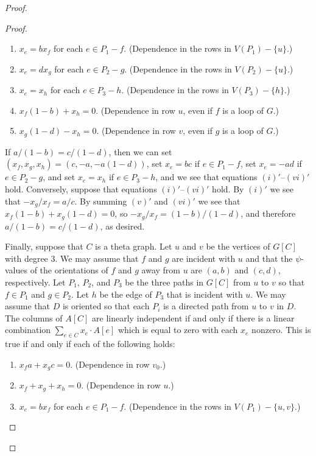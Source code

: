 \documentclass[12pt]{article}
\theoremstyle{definition}
\begin{document}
\begin{proof}
\begin{proof}
\begin{enumerate}[label=$(\roman*)'$]
    \item $x_e = bx_f$ for each $e \in P_1 - f$. (Dependence in the rows in $V(P_1) - \{u\}$.)

    \item $x_e = dx_g$ for each $e \in P_2 - g$. (Dependence in the rows in $V(P_2) - \{u\}$.)

    \item $x_e = x_h$ for each $e \in P_3 - h$. (Dependence in the rows in $V(P_3) - \{h\}$.)

     \item $x_f(1 - b) + x_h = 0$. (Dependence in row $u$, even if $f$ is a loop of $G$.)

     \item $x_g(1 - d) - x_h = 0$. (Dependence in row $v$, even if $g$ is a loop of $G$.)
\end{enumerate}
If $a/(1-b) = c/(1-d)$, then we can set $(x_f, x_g, x_h) = (c, -a, -a(1 - d))$, set $x_e = bc$ if $e \in P_1 - f$, set $x_e =-ad$ if $e \in P_2 - g$, and set $x_e = x_h$ if $e \in P_3 - h$, and we see that equations $(i)'$--$(vi)'$ hold.
Conversely, suppose that equations $(i)'$--$(vi)'$ hold.
By $(i)'$ we see that $-x_g/x_f = a/c$.
By summing $(v)'$ and $(vi)'$ we see that $x_f(1 - b) + x_g(1 - d) = 0$, so $-x_g/x_f = (1 - b)/(1 - d)$, and therefore $a/(1 - b) = c/(1 - d)$, as desired.




Finally, suppose that $C$ is a theta graph.
Let $u$ and $v$ be the vertices of $G[C]$ with degree $3$.
We may assume that $f$ and $g$ are incident with $u$ and that the $\psi$-values of the orientations of $f$ and $g$ away from $u$ are $(a,b)$ and $(c,d)$, respectively.
Let $P_1$, $P_2$, and $P_3$ be the three paths in $G[C]$ from $u$ to $v$ so that $f \in P_1$ and $g \in P_2$.
Let $h$ be the edge of $P_3$ that is incident with $u$.
We may assume that $D$ is oriented so that each $P_i$ is a directed path from $u$ to $v$ in $D$.
The columns of $A[C]$ are linearly independent if and only if there is a linear combination $\sum_{e \in C} x_e  \cdot A[e]$ which is equal to zero with each $x_e$ nonzero.
This is true if and only if each of the following holds:
\begin{enumerate}[label=$(\roman*)''$]
    \item $x_fa + x_gc = 0$. (Dependence in row $v_0$.)

    \item $x_f + x_g + x_h = 0$. (Dependence in row $u$.)

    \item $x_e = bx_f$ for each $e \in P_1 - f$. (Dependence in the rows in $V(P_1) - \{u,v\}$.)


\end{enumerate}
\end{proof}
\end{proof}
\end{document}

